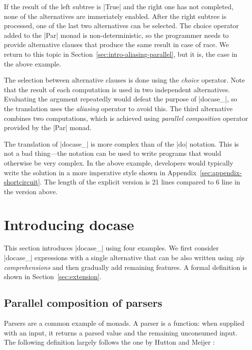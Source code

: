 \documentclass{sigplanconf}
\begin{document}
If the result of the left subtree is |True| and the right one has not completed, none of 
the alternatives are immeriately enabled. After the right subtree is processed, one of the last two alternatives 
can be selected. The choice operator added to the |Par| monad is non-deterministic, so the 
programmer needs to provide alternative clauses that produce the same result in case of race.
We return to this topic in Section~\ref{sec:intro-aliasing-parallel}, but it is, the case in 
the above example.

The selection between alternative clauses is done using the \textit{choice} operator. Note that the result 
of each computation is used in two independent alternatives. Evaluating the argument repeatedly 
would defeat the purpose of |docase_|, so the translation uses the \textit{aliasing} operator to avoid 
this. The third alternative combines two computations, which is achieved using \textit{parallel
composition} operator provided by the |Par| monad.

The translation of |docase_| is more complex than of the |do| notation. This is not
a bad thing---the notation can be used to write programs that would otherwise be very complex. 
In the above example, developers would typically write the solution in a more imperative style 
shown in Appendix~\ref{sec:appendix-shortcircuit}. The length of the explicit version is 21 lines 
compared to 6 line in the version above. 


\section{Introducing docase}
This section introduces |docase_| using four examples. We first consider |docase_|
expressions with a single alternative that can be also written using \textit{zip comprehensions} 
\cite{comprefun} and then gradually add remaining features. A formal 
definition is shown in Section~\ref{sec:extension}.


\subsection{Parallel composition of parsers}
\label{sec:intro-combining-parsers}
Parsers are a common example of monads. A parser is a function: when supplied with an input, it 
returns a parsed value and the remaining unconsumed input. The following definition largely follows
the one by Hutton and Meijer \cite{parsingtutorial}:
\end{document}
